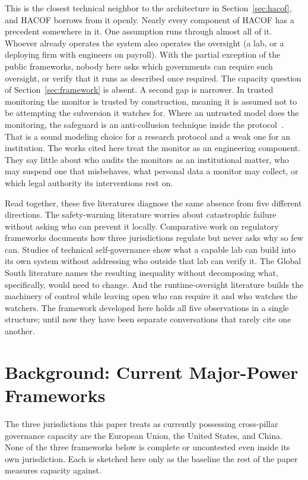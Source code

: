 \documentclass{ieeeaccess}
\newcommand{\hacof}{HACOF}
\begin{document}
This is the closest technical neighbor to the architecture in Section~\ref{sec:hacof}, and \hacof{} borrows from it openly. Nearly every component of \hacof{} has a precedent somewhere in it. One assumption runs through almost all of it. Whoever already operates the system also operates the oversight (a lab, or a deploying firm with engineers on payroll). With the partial exception of the public frameworks, nobody here asks which governments can require such oversight, or verify that it runs as described once required. The capacity question of Section~\ref{sec:framework} is absent. A second gap is narrower. In trusted monitoring the monitor is trusted by construction, meaning it is assumed not to be attempting the subversion it watches for. Where an untrusted model does the monitoring, the safeguard is an anti-collusion technique inside the protocol~\cite{greenblatt2024aicontrol}.
That is a sound modeling choice for a research protocol and a weak one for an institution. The works cited here treat the monitor as an engineering component. They say little about who audits the monitors as an institutional matter, who may suspend one that misbehaves, what personal data a monitor may collect, or which legal authority its interventions rest on.

Read together, these five literatures diagnose the same absence from five different directions. The safety-warning literature worries about catastrophic failure without asking who can prevent it locally. Comparative work on regulatory frameworks documents how three jurisdictions regulate but never asks why so few can. Studies of technical self-governance show what a capable lab can build into its own system without addressing who outside that lab can verify it. The Global South literature names the resulting inequality without decomposing what, specifically, would need to change. And the runtime-oversight literature builds the machinery of control while leaving open who can require it and who watches the watchers. The framework developed here holds all five observations in a single structure; until now they have been separate conversations that rarely cite one another.

\section{Background: Current Major-Power Frameworks}
\label{sec:background}

The three jurisdictions this paper treats as currently possessing cross-pillar governance capacity are the European Union, the United States, and China. None of the three frameworks below is complete or uncontested even inside its own jurisdiction. Each is sketched here only as the baseline the rest of the paper measures capacity against.
\end{document}
